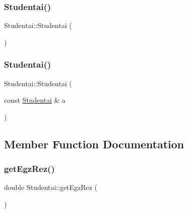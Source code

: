 \mbox{\label{class_studentai_a8f53d55bca475d5bf1973f4f3c53f047}} 
\subsubsection{\texorpdfstring{Studentai()}{Studentai()}\hspace{0.1cm}{\footnotesize\ttfamily [1/2]}}
{\footnotesize\ttfamily Studentai\+::\+Studentai (\begin{DoxyParamCaption}{ }\end{DoxyParamCaption})\hspace{0.3cm}{\ttfamily [inline]}}

\mbox{\label{class_studentai_a0c7d19b397626f33dc2e127d7c41c445}} 
\subsubsection{\texorpdfstring{Studentai()}{Studentai()}\hspace{0.1cm}{\footnotesize\ttfamily [2/2]}}
{\footnotesize\ttfamily Studentai\+::\+Studentai (\begin{DoxyParamCaption}\item[{const \mbox{\hyperlink{class_studentai}{Studentai}} \&}]{a }\end{DoxyParamCaption})\hspace{0.3cm}{\ttfamily [inline]}}



\subsection{Member Function Documentation}
\mbox{\label{class_studentai_a9f8cc8dd7f888c7a8d9fb2db070195d6}} 
\subsubsection{\texorpdfstring{getEgzRez()}{getEgzRez()}}
{\footnotesize\ttfamily double Studentai\+::get\+Egz\+Rez (\begin{DoxyParamCaption}{ }\end{DoxyParamCaption})\hspace{0.3cm}{\ttfamily [inline]}}

